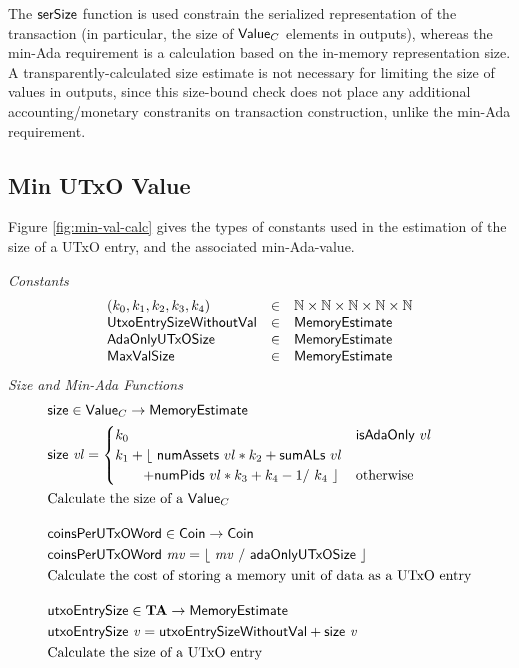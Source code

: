     The $\mathsf{serSize}$ function is used constrain
    the serialized representation of the transaction (in particular, the size
    of $\mathsf{Value}_C$ elements in outputs), whereas the min-Ada requirement is a calculation based on
    the in-memory representation size. A transparently-calculated size estimate
    is not necessary for limiting the size of values in outputs, since this size-bound
    check does not place any additional accounting/monetary constranits on transaction construction,
    unlike the min-Ada requirement.

\subsection{Min UTxO Value}
\label{sec:min-value}

Figure \ref{fig:min-val-calc} gives the types of constants used in the estimation
of the size of a UTxO entry, and the associated min-Ada-value.

\begin{figure*}[h]
  \emph{Constants}
  \begin{equation*}
    \begin{array}{lcl}
      (k_0, k_1, k_2, k_3, k_4) & \in & \mathbb{N} \times \mathbb{N} \times \mathbb{N} \times \mathbb{N} \times \mathbb{N} \\
      \mathsf{UtxoEntrySizeWithoutVal} & \in & \mathsf{MemoryEstimate} \\
      \mathsf{AdaOnlyUTxOSize} & \in & \mathsf{MemoryEstimate} \\
      \mathsf{MaxValSize} & \in & \mathsf{MemoryEstimate} \\
    \end{array}
  \end{equation*}
  \emph{Size and Min-Ada Functions}
  \begin{align*}
    & \fun{size} \in \Value_C \to \MemoryEstimate \\
    & \fun{size}~\var{vl} =
    \begin{cases}
      k_0 & \fun{isAdaOnly}~vl\\
      k_1 + \lfloor~ \fun{numAssets}~vl * k_2 + \fun{sumALs}~vl & \\
      ~~~~~~ + \fun{numPids}~vl * k_3 + k_4 - 1 /~ k_4~\rfloor & \text{otherwise} \\
    \end{cases} \\
    & \text{Calculate the size of a $\Value_C$}
    \nextdef
    & \fun{coinsPerUTxOWord}\in \Coin \to \Coin \\
    & \fun{coinsPerUTxOWord}~\var{mv} = \lfloor~ \var{mv}~/~ \mathsf{adaOnlyUTxOSize}~ \rfloor \\
    & \text{Calculate the cost of storing a memory unit of data as a UTxO entry}
    \nextdef
    & \fun{utxoEntrySize} \in \ValMonoid \to \MemoryEstimate \\
    & \fun{utxoEntrySize}~\var{v} = \mathsf{utxoEntrySizeWithoutVal} + \fun{size}~\var{v} \\
    & \text{Calculate the size of a UTxO entry}
\end{align*}
\caption{Value Size Calculation}
\label{fig:min-val-calc}
\end{figure*}

